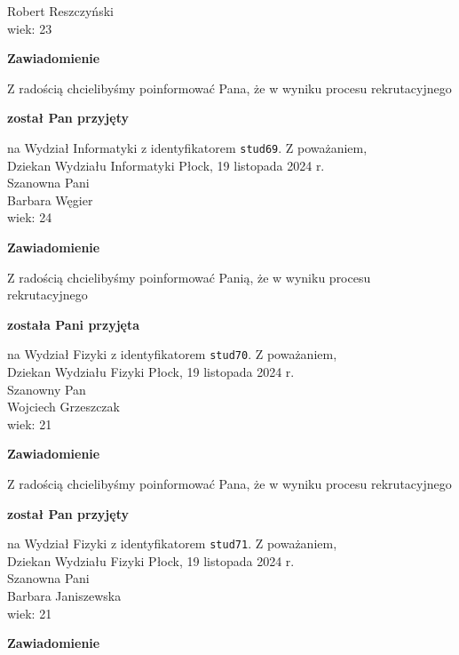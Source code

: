 \documentclass[12pt,a4paper]{article}
\begin{document}
Robert Reszczyński \\
wiek: 23
\bigskip
\begin{center}
    {\Large\textbf{Zawiadomienie}}
\end{center}
\bigskip 
Z radością chcielibyśmy poinformować Pana, że w wyniku procesu rekrutacyjnego
\begin{center}
\textsf{\textbf{został Pan przyjęty}}
\end{center}
na Wydział Informatyki z identyfikatorem \verb|stud69|. 
\vspace{2cm}
\noindent
Z poważaniem, \\
Dziekan
Wydziału Informatyki
\newpage
\hfill Płock, 19 listopada 2024 r. \\
\noindent
Szanowna Pani \\
Barbara Węgier \\
wiek: 24
\bigskip
\begin{center}
    {\Large\textbf{Zawiadomienie}}
\end{center}
\bigskip 
Z radością chcielibyśmy poinformować Panią, że w wyniku procesu rekrutacyjnego
\begin{center}
\textsf{\textbf{została Pani przyjęta}}
\end{center}
na Wydział Fizyki z identyfikatorem \verb|stud70|. 
\vspace{2cm}
\noindent
Z poważaniem, \\
Dziekan
Wydziału Fizyki
\newpage
\hfill Płock, 19 listopada 2024 r. \\
\noindent
Szanowny Pan \\
Wojciech Grzeszczak \\
wiek: 21
\bigskip
\begin{center}
    {\Large\textbf{Zawiadomienie}}
\end{center}
\bigskip 
Z radością chcielibyśmy poinformować Pana, że w wyniku procesu rekrutacyjnego
\begin{center}
\textsf{\textbf{został Pan przyjęty}}
\end{center}
na Wydział Fizyki z identyfikatorem \verb|stud71|. 
\vspace{2cm}
\noindent
Z poważaniem, \\
Dziekan
Wydziału Fizyki
\newpage
\hfill Płock, 19 listopada 2024 r. \\
\noindent
Szanowna Pani \\
Barbara Janiszewska \\
wiek: 21
\bigskip
\begin{center}
    {\Large\textbf{Zawiadomienie}}
\end{center}
\end{document}
